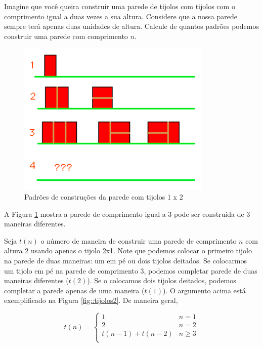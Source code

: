 \begin{exemplo}
Imagine que você queira construir uma parede de tijolos com tijolos com o comprimento igual a duas vezes a sua altura. Considere que a nossa parede sempre terá apenas duas unidades de altura. Calcule de quantos padrões podemos construir uma parede com comprimento $n$.

\begin{figure}[!htbp]
\caption{Padrões de construções da parede com tijolos 1 x 2}
\label{fig::tijolos}
\begin{center}
\includegraphics[scale=0.7]{images/pattern.png} 
\end{center}
\end{figure}

A Figura \ref{fig::tijolos} mostra a parede de comprimento igual a 3 pode ser construída de 3 maneiras diferentes.

Seja $t(n)$ o número de maneira de construir uma parede de comprimento $n$ com altura 2 usando apenas o tijolo 2x1. Note que podemos colocar o primeiro tijolo na parede de duas maneiras: um em pé ou dois tijolos deitados. Se colocarmos um tijolo em pé na parede de comprimento 3, podemos completar parede de duas maneiras diferentes ($t(2)$). Se o colocamos dois tijolos deitados, podemos completar a parede apenas de uma maneira ($t(1)$). O argumento acima está exemplificado na Figura \ref{fig::tijolos2}. De maneira geral,

$$t(n) = 
\begin{cases}
1 & n = 1\\
2 & n = 2\\
t(n-1) + t(n-2) & n \geq 3\\
\end{cases}
$$


\end{exemplo}
